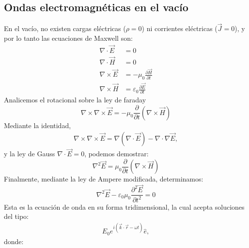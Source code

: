 \documentclass[letterpaper,10pt,english]{jupyterBook}
\begin{document}
\subsection{Ondas electromagnéticas en el vacío}
\label{\detokenize{1_ondas_electromagneticas/1_ondas_electromagneticas:ondas-electromagneticas-en-el-vacio}}
\sphinxAtStartPar
En el vacío, no existen cargas eléctricas (\(\rho=0\)) ni corrientes eléctricas (\(\vec{J} = 0\)), y por lo tanto las ecuaciones de Maxwell son:
\begin{align*}
\nabla\cdot\vec{E} &= 0 \\
\nabla\cdot\vec{H} &= 0 \\
\nabla\times\vec{E} &= -\mu_0\frac{\partial \vec{H}}{\partial t} \\
\nabla\times\vec{H} &= \varepsilon_0\frac{\partial \vec{E}}{\partial t}
\end{align*}
\sphinxAtStartPar
Analicemos el rotacional sobre la ley de faraday
\begin{equation*}
\nabla\times\nabla\times\vec{E} = -\mu_0\frac{\partial}{\partial t}\left(\nabla\times \vec{H}\right)
\end{equation*}
\sphinxAtStartPar
Mediante la identidad,
\begin{equation*}
\begin{split}\nabla\times\nabla\times\vec{E} = \nabla\left(\nabla\cdot\vec{E}\right) - \nabla\cdot\nabla\vec{E},\end{split}
\end{equation*}
\sphinxAtStartPar
y la ley de Gauss \(\nabla\cdot\vec{E} = 0\), podemos demostrar:
\begin{equation*}
\nabla^2\vec{E} = \mu_0\frac{\partial}{\partial t}\left(\nabla\times \vec{H}\right)
\end{equation*}
\sphinxAtStartPar
Finalmente, mediante la ley de Ampere modificada, determinamos:
\begin{equation*}
\nabla^2\vec{E} - \varepsilon_0\mu_0\frac{\partial^2\vec{E}}{\partial t^2} = 0
\end{equation*}
\sphinxAtStartPar
Esta es la ecuación de onda en su forma tridimensional, la cual acepta soluciones del tipo:
\begin{equation*}
\begin{split}E_0 e^{i\left(\vec{k}\cdot\vec{r} - \omega t\right)} \hat{e},\end{split}
\end{equation*}
\sphinxAtStartPar
donde:
\end{document}
